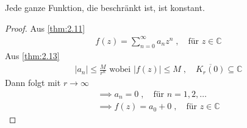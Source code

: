 \documentclass[a4paper,10pt]{scrbook}
\begin{document}
\begin{theorem}
  Jede ganze Funktion, die beschränkt ist, ist konstant.

  \begin{proof}
    Aus \ref{thm:2.11}
    \begin{align*}
      f(z) = \sum\limits_{n=0}^{\infty} a_n z^n \; , \quad \text{für } z \in \mathbb{C}
    \end{align*}
    Aus \ref{thm:2.13}
    \begin{align*}
      |a_n| \leq \frac{M}{r^n} \text{ wobei } |f(z)| \leq M \; , \quad \overline{K_r(0)} \subseteq \mathbb{C}
    \end{align*}
    Dann folgt mit $r \to \infty$
    \begin{gather*}
      \implies a_n = 0 \; , \quad \text{für } n = 1, 2, \ldots \\
      \implies f(z) = a_0 + 0  \; , \quad \text{für } z \in \mathbb{C}
    \end{gather*}
  \end{proof}
\end{theorem}
\end{document}
